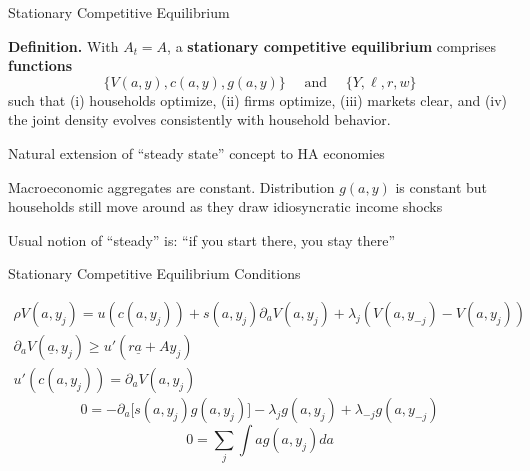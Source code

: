 \documentclass[11pt, aspectratio=169]{beamer}
\newenvironment{witemize}{\itemize\addtolength{\itemsep}{10pt}}{\enditemize}
\begin{document}
\begin{frame}{Stationary Competitive Equilibrium}


\textbf{Definition.} With $A_t = A$, a \textbf{stationary competitive equilibrium} comprises \textbf{functions}
\begin{equation*}
	\Big\{ V(a, y), c(a, y), g(a, y) \Big\} 
	\quad \text{ and } \quad
	\Big\{ Y, \ell, r, w \Big\}
\end{equation*}
such that (i) households optimize, (ii) firms optimize, (iii) markets clear, and (iv) the joint density evolves consistently with household behavior. 


\vspace{5mm}
\begin{witemize}
\item Natural extension of ``steady state'' concept to HA economies

\item Macroeconomic aggregates are constant. Distribution $g(a, y)$ is constant but households still move around as they draw idiosyncratic income shocks

\item Usual notion of ``steady'' is: ``if you start there, you stay there'' 
\end{witemize}

\end{frame}


\begin{frame}{Stationary Competitive Equilibrium Conditions}

\vspace{2mm}
\begin{gather*}
	\rho V(a, y_j) = u(c(a, y_j)) + s(a, y_j) \partial_a V(a, y_j) + \lambda_j(V(a, y_{-j}) - V(a, y_j)) \\[6pt]
	\partial_a V(\underline a, y_j) \geq u'(r \underline a + A y_j)  \\[6pt]
	u'(c(a, y_j)) = \partial_a V(a, y_j)
\end{gather*}
\begin{equation*}
	0 = -\partial_a \Big[ s(a, y_j) g(a, y_j) \Big] - \lambda_j g(a, y_j) + \lambda_{-j} g(a, y_{-j}) 
\end{equation*}
\begin{equation*}
	0 = \sum_j \int a g(a, y_j) da
\end{equation*}

\end{frame}
\end{document}
